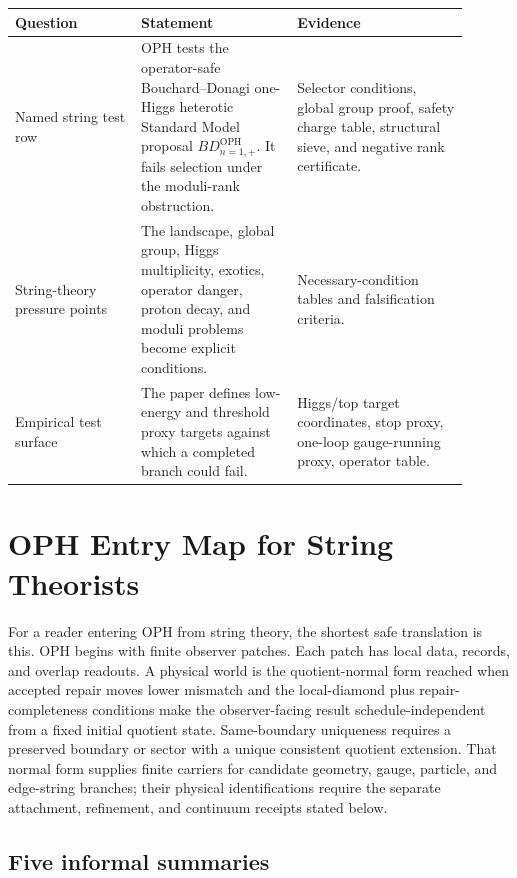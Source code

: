 \documentclass[11pt]{article}
\theoremstyle{remark}
\theoremstyle{plain}
\newcommand{\OPH}{\mathrm{OPH}}
\begin{document}
\begin{center}
\small
\begin{tabular}{L{0.25\linewidth}L{0.31\linewidth}L{0.34\linewidth}}
\toprule
\textbf{Question} & \textbf{Statement} & \textbf{Evidence} \\
\midrule
Named string test row & OPH tests the operator-safe Bouchard--Donagi one-Higgs heterotic
Standard Model proposal \(BD_{n=1,+}^{\OPH}\). It fails selection under
the moduli-rank obstruction. & Selector conditions, global group proof, safety charge table,
structural sieve, and negative rank certificate. \\
String-theory pressure points & The landscape, global group, Higgs multiplicity, exotics,
operator danger, proton decay, and moduli problems become explicit conditions. & Necessary-condition
tables and falsification criteria. \\
Empirical test surface & The paper defines low-energy and threshold proxy targets
against which a completed branch could fail. & Higgs/top target coordinates, stop proxy,
one-loop gauge-running proxy, operator table. \\
\bottomrule
\end{tabular}
\end{center}


\section{OPH Entry Map for String Theorists}

For a reader entering OPH from string theory, the shortest safe translation is this. OPH begins
with finite observer patches. Each patch has local data, records, and overlap readouts. A physical
world is the quotient-normal form reached when accepted repair moves lower mismatch and the
local-diamond plus repair-completeness conditions make the observer-facing result
schedule-independent from a fixed initial quotient state. Same-boundary uniqueness requires a
preserved boundary or sector with a unique consistent quotient extension.
That normal form supplies finite carriers for candidate geometry, gauge,
particle, and edge-string branches; their physical identifications require the
separate attachment, refinement, and continuum receipts stated below.

\subsection{Five informal summaries}
\end{document}
